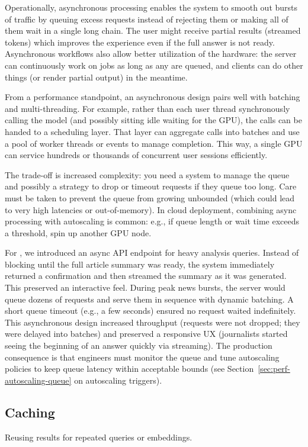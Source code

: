 Operationally, asynchronous processing enables the system to smooth out bursts of traffic by queuing excess requests instead of rejecting them or making all of them wait in a single long chain. The user might receive partial results (streamed tokens) which improves the experience even if the full answer is not ready. Asynchronous workflows also allow better utilization of the hardware: the server can continuously work on jobs as long as any are queued, and clients can do other things (or render partial output) in the meantime.

From a performance standpoint, an asynchronous design pairs well with batching and multi-threading. For example, rather than each user thread synchronously calling the model (and possibly sitting idle waiting for the GPU), the calls can be handed to a scheduling layer. That layer can aggregate calls into batches and use a pool of worker threads or events to manage completion. This way, a single GPU can service hundreds or thousands of concurrent user sessions efficiently.

The trade-off is increased complexity: you need a system to manage the queue and possibly a strategy to drop or timeout requests if they queue too long. Care must be taken to prevent the queue from growing unbounded (which could lead to very high latencies or out-of-memory). In cloud deployment, combining async processing with autoscaling is common: e.g., if queue length or wait time exceeds a threshold, spin up another GPU node.

For \ishtar{}, we introduced an async API endpoint for heavy analysis queries. Instead of blocking until the full article summary was ready, the system immediately returned a confirmation and then streamed the summary as it was generated. This preserved an interactive feel. During peak news bursts, the server would queue dozens of requests and serve them in sequence with dynamic batching. A short queue timeout (e.g., a few seconds) ensured no request waited indefinitely. This asynchronous design increased throughput (requests were not dropped; they were delayed into batches) and preserved a responsive UX (journalists started seeing the beginning of an answer quickly via streaming). The production consequence is that engineers must monitor the queue and tune autoscaling policies to keep queue latency within acceptable bounds (see Section~\ref{sec:perf-autoscaling-queue} on autoscaling triggers).

\subsection{Caching}
\label{sec:perf-cache}
Reusing results for repeated queries or embeddings.

